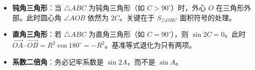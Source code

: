 \begin{trapbox}
\begin{itemize}
    \item \textbf{钝角三角形}：当 $\triangle ABC$ 为钝角三角形（如 $C > 90^\circ$）时，外心 $O$ 在三角形外部。此时圆心角 $\angle AOB$ 依然为 $2C$。关键在于 $S_{\triangle OBC}$ 面积符号的处理。
    \item \textbf{直角三角形}：若 $\triangle ABC$ 为直角三角形（如 $C=90^\circ$），则 $\sin 2C = 0$。此时 $\vec{OA} \cdot \vec{OB} = R^2 \cos 180^\circ = -R^2$。基准等式退化为只有两项。
    \item \textbf{系数二倍角}：务必记牢系数是 $\sin 2A$，而不是 $\sin A$。
\end{itemize}
\end{trapbox}